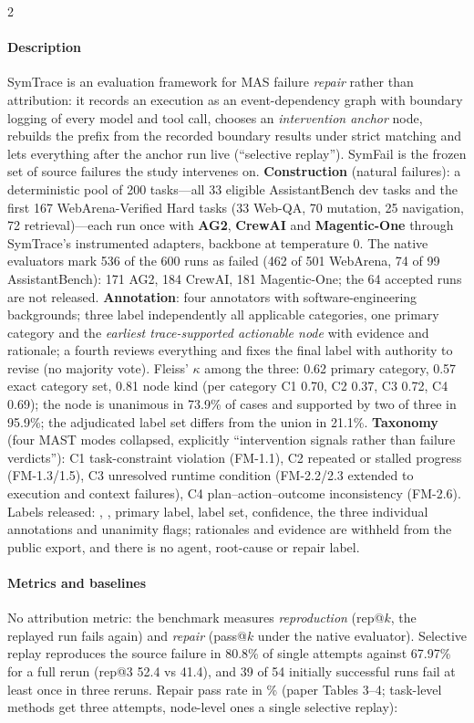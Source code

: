 \begin{multicols}{2}
\paragraph{Description} SymTrace is an evaluation framework for MAS failure \emph{repair} rather than attribution: it records an execution as an event-dependency graph with boundary logging of every model and tool call, chooses an \emph{intervention anchor} node, rebuilds the prefix from the recorded boundary results under strict matching and lets everything after the anchor run live (``selective replay''). SymFail is the frozen set of source failures the study intervenes on. \textbf{Construction} (natural failures): a deterministic pool of 200 tasks---all 33 eligible AssistantBench dev tasks and the first 167 WebArena-Verified Hard tasks (33 Web-QA, 70 mutation, 25 navigation, 72 retrieval)---each run once with \textbf{AG2}, \textbf{CrewAI} and \textbf{Magentic-One} through SymTrace's instrumented adapters, backbone  at temperature 0. The native evaluators mark 536 of the 600 runs as failed (462 of 501 WebArena, 74 of 99 AssistantBench): 171 AG2, 184 CrewAI, 181 Magentic-One; the 64 accepted runs are not released. \textbf{Annotation}: four annotators with software-engineering backgrounds; three label independently all applicable categories, one primary category and the \emph{earliest trace-supported actionable node} with evidence and rationale; a fourth reviews everything and fixes the final label with authority to revise (no majority vote). Fleiss' $\kappa$ among the three: 0.62 primary category, 0.57 exact category set, 0.81 node kind (per category C1 0.70, C2 0.37, C3 0.72, C4 0.69); the node is unanimous in 73.9\% of cases and supported by two of three in 95.9\%; the adjudicated label set differs from the union in 21.1\%. \textbf{Taxonomy} (four MAST modes collapsed, explicitly ``intervention signals rather than failure verdicts''): C1 task-constraint violation (FM-1.1), C2 repeated or stalled progress (FM-1.3/1.5), C3 unresolved runtime condition (FM-2.2/2.3 extended to execution and context failures), C4 plan--action--outcome inconsistency (FM-2.6). Labels released: , , primary label, label set, confidence, the three individual annotations and unanimity flags; rationales and evidence are withheld from the public export, and there is no agent, root-cause or repair label.

\paragraph{Metrics and baselines} No attribution metric: the benchmark measures \emph{reproduction} (rep@$k$, the replayed run fails again) and \emph{repair} (pass@$k$ under the native evaluator). Selective replay reproduces the source failure in 80.8\% of single attempts against 67.97\% for a full rerun (rep@3 52.4 vs 41.4), and 39 of 54 initially successful runs fail at least once in three reruns. Repair pass rate in \% (paper Tables 3--4; task-level methods get three attempts, node-level ones a single selective replay):


\end{multicols}
